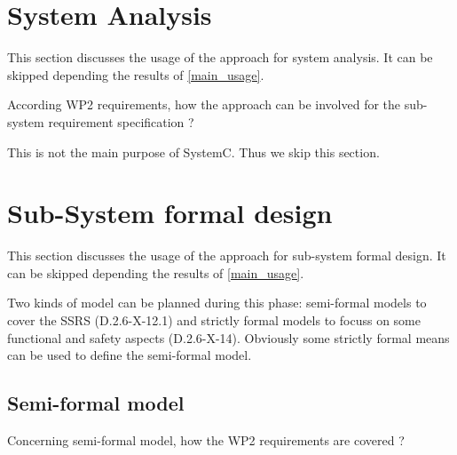 \section{System Analysis}
This section discusses the usage of the approach for system analysis.
It can be skipped depending the results of \ref{main_usage}.

According WP2 requirements, how the approach can be involved for the sub-system requirement specification ?

\begin{author_comment}
This is not the main purpose of SystemC. Thus we skip this section.
\end{author_comment}

\section{Sub-System formal design}
This section discusses the usage of the approach for sub-system formal design.
It can be skipped depending the results of \ref{main_usage}.

Two kinds of model can be planned during this phase: semi-formal models to cover the SSRS (D.2.6-X-12.1) and strictly formal models to focuss on some functional and safety aspects (D.2.6-X-14). Obviously some strictly formal means can be used to define the semi-formal model.

\subsection{Semi-formal model}

Concerning semi-formal model, how the WP2 requirements are covered ?

